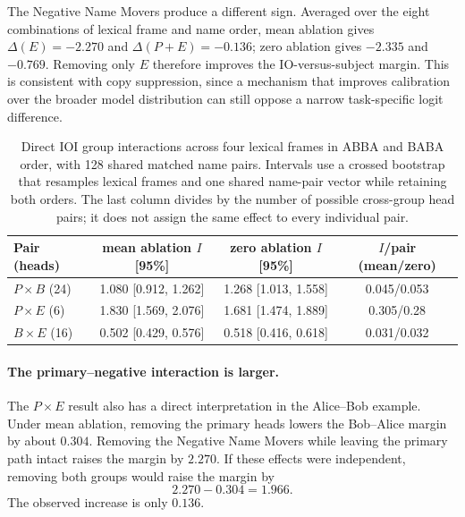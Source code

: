 \documentclass[sigconf,10pt,nonacm,balance=false]{acmart}
\begin{document}
The Negative Name Movers produce a different sign. Averaged over the eight combinations of lexical frame and name order, mean ablation gives $\Delta(E)=-2.270$ and $\Delta(P+E)=-0.136$; zero ablation gives $-2.335$ and $-0.769$. Removing only $E$ therefore improves the IO-versus-subject margin. This is consistent with copy suppression, since a mechanism that improves calibration over the broader model distribution can still oppose a narrow task-specific logit difference.

\begin{table}[t]
\centering
\caption{Direct IOI group interactions across four lexical frames in ABBA and BABA order, with 128 shared matched name pairs. Intervals use a crossed bootstrap that resamples lexical frames and one shared name-pair vector while retaining both orders. The last column divides by the number of possible cross-group head pairs; it does not assign the same effect to every individual pair.}
\label{tab:ioi-direct}
\scriptsize
\setlength{\tabcolsep}{2pt}
\begin{tabular}{@{}lccc@{}}
\toprule
Pair (heads) & \shortstack{mean ablation\\$I$ [95\%]} & \shortstack{zero ablation\\$I$ [95\%]} & \shortstack{$I$/pair\\(mean/zero)} \\
\midrule
$P\times B$ (24) & 1.080 [0.912, 1.262] & 1.268 [1.013, 1.558] & 0.045/0.053 \\
$P\times E$ (6)  & 1.830 [1.569, 2.076] & 1.681 [1.474, 1.889] & 0.305/0.28 \\
$B\times E$ (16) & 0.502 [0.429, 0.576]    & 0.518 [0.416, 0.618]    & 0.031/0.032 \\
\bottomrule
\end{tabular}
\end{table}

\paragraph{The primary--negative interaction is larger.}

The $P\times E$ result also has a direct interpretation in the Alice--Bob example. Under mean ablation, removing the primary heads lowers the Bob--Alice margin by about $0.304$. Removing the Negative Name Movers while leaving the primary path intact raises the margin by $2.270$. If these effects were independent, removing both groups would raise the margin by
\[
2.270-0.304=1.966.
\]
The observed increase is only $0.136$.
\end{document}
